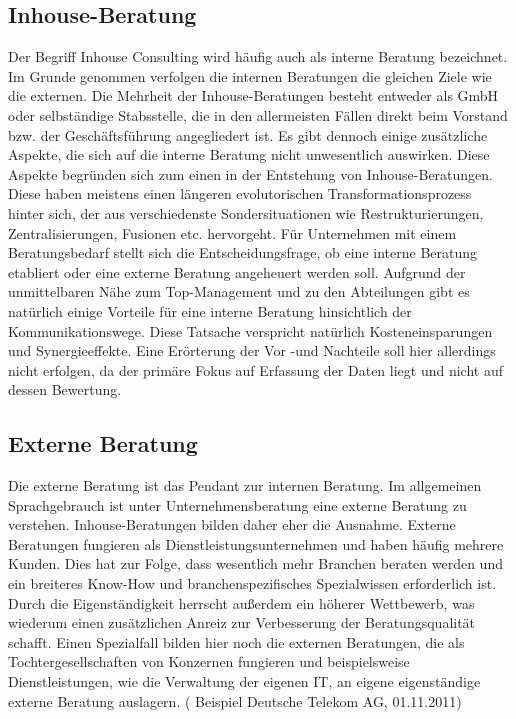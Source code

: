\subsection*{Inhouse-Beratung}
Der Begriff Inhouse Consulting wird häufig auch als interne Beratung bezeichnet. \cite[150]{ReinekeBock200709}
Im Grunde genommen verfolgen die internen Beratungen die gleichen Ziele wie die externen. Die Mehrheit der Inhouse-Beratungen besteht entweder als GmbH oder selbständige Stabsstelle, die in den allermeisten Fällen direkt beim Vorstand bzw. der Geschäftsführung angegliedert ist. \cite[14]{B2_InhouseConsulting}
Es gibt dennoch einige zusätzliche Aspekte, die sich auf die interne Beratung nicht unwesentlich auswirken. Diese Aspekte begründen sich zum einen in der Entstehung von Inhouse-Beratungen. Diese haben meistens einen längeren evolutorischen Transformationsprozess hinter sich, der aus verschiedenste Sondersituationen wie Restrukturierungen, Zentralisierungen, Fusionen etc. hervorgeht. \cite[160]{Lippold201309}
Für Unternehmen mit einem Beratungsbedarf stellt sich die Entscheidungsfrage, ob eine interne Beratung etabliert oder eine externe Beratung angeheuert werden soll.
Aufgrund der unmittelbaren Nähe zum Top-Management und zu den Abteilungen gibt es natürlich einige Vorteile für eine interne Beratung hinsichtlich der Kommunikationswege.
Diese Tatsache verspricht natürlich Kosteneinsparungen und Synergieeffekte. Eine Erörterung der Vor -und Nachteile soll hier allerdings nicht erfolgen, da der primäre Fokus auf Erfassung der Daten liegt und nicht auf dessen Bewertung.

\subsection*{Externe Beratung}
Die externe Beratung ist das Pendant zur internen Beratung. Im allgemeinen Sprachgebrauch ist unter Unternehmensberatung eine externe Beratung zu verstehen. Inhouse-Beratungen bilden daher eher die Ausnahme. Externe Beratungen fungieren als Dienstleistungsunternehmen und haben häufig mehrere Kunden. Dies hat zur Folge, dass wesentlich mehr Branchen beraten werden und ein breiteres Know-How und branchenspezifisches Spezialwissen erforderlich ist. Durch die Eigenständigkeit herrscht außerdem ein höherer Wettbewerb, was wiederum einen zusätzlichen Anreiz zur Verbesserung der Beratungsqualität schafft.
Einen Spezialfall bilden hier noch die externen Beratungen, die als Tochtergesellschaften von Konzernen fungieren und beispielsweise Dienstleistungen, wie  die Verwaltung der eigenen IT, an eigene eigenständige externe Beratung auslagern. ( Beispiel Deutsche Telekom AG, 01.11.2011)


